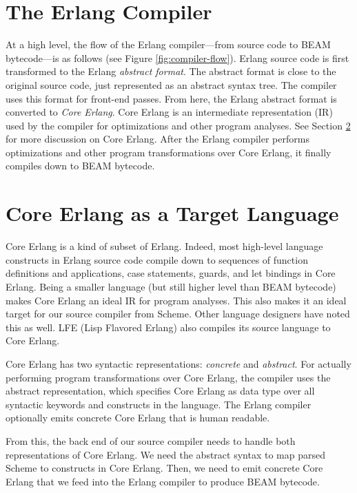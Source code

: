 \section{The Erlang Compiler}
\label{sec:erlang-compiler}

At a high level, the flow of the Erlang compiler---from source code to BEAM bytecode---is as follows (see Figure \ref{fig:compiler-flow}). 
Erlang source code is first transformed to the Erlang \emph{abstract format}. 
The abstract format is close to the original source code, just represented as an abstract syntax tree. The compiler uses this format for front-end passes. 
From here, the Erlang abstract format is converted to \emph{Core Erlang}. 
Core Erlang is an intermediate representation (IR) used by the compiler for optimizations and other program analyses. 
See Section \ref{sec:core-erlang} for more discussion on Core Erlang. 
After the Erlang compiler performs optimizations and other program transformations over Core Erlang, it finally compiles down to BEAM bytecode. 

\section{Core Erlang as a Target Language}
\label{sec:core-erlang}

Core Erlang is a kind of subset of Erlang. 
Indeed, most high-level language constructs in Erlang source code compile down to sequences of function definitions and applications, case statements, guards, and let bindings in Core Erlang. 
Being a smaller language (but still higher level than BEAM bytecode) makes Core Erlang an ideal IR for program analyses. 
This also makes it an ideal target for our source compiler from Scheme. 
Other language designers have noted this as well. 
LFE (Lisp Flavored Erlang) \cite{} also compiles its source language to Core Erlang. 

Core Erlang has two syntactic representations: \emph{concrete} and \emph{abstract}. 
For actually performing program transformations over Core Erlang, the compiler uses the abstract representation, which specifies Core Erlang as data type over all syntactic keywords and constructs in the language. 
The Erlang compiler optionally emits concrete Core Erlang that is human readable. 

From this, the back end of our source compiler needs to handle both representations of Core Erlang. 
We need the abstract syntax to map parsed Scheme to constructs in Core Erlang. 
Then, we need to emit concrete Core Erlang that we feed into the Erlang compiler to produce BEAM bytecode. 

